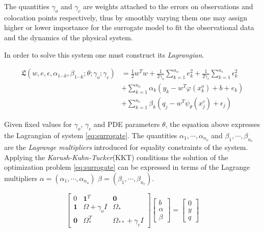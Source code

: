 \documentclass{article}
\begin{document}
The quantities $\gamma_{o}$ and $\gamma_{c}$ are weights attached to
the errors on observations and colocation points respectively, thus
by smoothly varying them one may assign higher or lower importance for
the surrogate model to fit the observational data and the dynamics of
the physical system.

In order to solve this system one must construct its
\emph{Lagrangian}.

\begin{align*}\label{eq:lag}
      \mathfrak{L}(w,e,\epsilon, \alpha_{1 \cdots k}, \beta_{1 \cdots k}; \theta; \gamma_{o}; \gamma_{c}) &= 
      \frac{1}{2} w^{T}w + \frac{1}{2\gamma_{o}} \sum_{k = 1}^{n_{o}}{e^{2}_{k}} +
      \frac{1}{2\gamma_{c}} \sum_{k = 1}^{n_{c}}{\epsilon^{2}_{k}} \\
      & + \sum_{k = 1}^{n_{o}}{\alpha_{k}(y_{k} - w^{T}\varphi(x^{o}_{k}) + b + e_{k})} \\
      & + \sum_{k = 1}^{n_{c}}{\beta_{k}(q_{j} - w^{T}\psi_{\theta}(x^{c}_{j}) + \epsilon_{j})} 
\end{align*}

Given fixed values for $\gamma_{o}$, $\gamma_{c}$ and PDE parameters
$\theta$, the equation above expresses the Lagrangian of system
\ref{eq:surrogate}. The quantities $\alpha_{1}, \cdots, \alpha_{n_{o}}$ and
$\beta_{1}, \cdots, \beta_{n_{c}}$ are the \emph{Lagrange multipliers}
introduced for equality constraints of the system. Applying the
\emph{Karush-Kuhn-Tucker}(KKT) conditions the solution of the
optimization problem \ref{eq:surrogate} can be expressed in terms of
the Lagrange multipliers $\alpha = (\alpha_{1}, \cdots, \alpha_{n_{o}})$
$\beta = (\beta_{1}, \cdots, \beta_{n_{c}})$.

\begin{equation}\label{eq:solution}
  \begin{bmatrix}
    0 & \mathbf{1}^{T} & \mathbf{0} \\ 
    \mathbf{1} & \Omega + \gamma_{o}I  & \Omega_*\\ 
    \mathbf{0} & \Omega_{*}^{T}  & \Omega_{**} + \gamma_{c}I 
  \end{bmatrix} \begin{bmatrix}
    b\\ 
    \alpha\\ 
    \beta
  \end{bmatrix} = \begin{bmatrix}
    0\\ 
    y\\ 
    q
  \end{bmatrix}
\end{equation}
\end{document}
